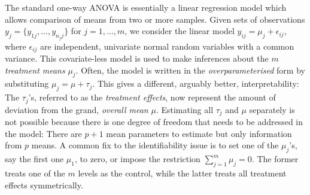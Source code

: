 The standard one-way ANOVA is essentially a linear regression model which allows comparison of means from two or more samples.
Given sets of observations $y_j = \{y_{1j},\dots,y_{n_jj}\}$ for $j=1,\dots,m$, we consider the linear model $y_{ij} = \mu_j + \epsilon_{ij}$, where $\epsilon_{ij}$ are independent, univariate normal random variables with a common variance.
This covariate-less model is used to make inferences about the $m$ \emph{treatment means} $\mu_j$.
Often, the model is written in the \emph{overparameterised} form by substituting $\mu_j = \mu + \tau_j$.
This gives a different, arguably better, interpretability: The $\tau_j$'s, referred to as the \emph{treatment effects}, now represent the amount of deviation from the grand, \emph{overall mean} $\mu$.
Estimating all $\tau_j$ and $\mu$ separately is not possible because there is one degree of freedom that needs to be addressed in the model: There are $p+1$ mean parameters to estimate but only information from $p$ means.
A common fix to the identifiability issue is to set one of the $\mu_j$'s, say the first one $\mu_1$, to zero, or impose the restriction $\sum_{j=1}^m \mu_j = 0$.
The former treats one of the $m$ levels as the control, while the latter treats all treatment effects symmetrically.


